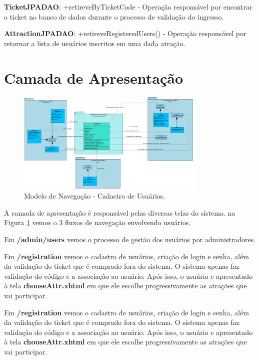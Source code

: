 \textbf{TicketJPADAO}: +retireveByTicketCode - Operação responsável por encontrar o ticket no banco de dados durante o processo de validação do ingresso.

\textbf{AttractionJPADAO}: +retireveRegisteredUsers() - Operação responsável por retornar a lista de usuários inscritos em uma dada atração.


\section{Camada de Apresentação}
\label{sec-frameweb-apresentacao}

\begin{figure}[h]
	\centering
	\includegraphics[width=0.8\textwidth]{figuras/ModeloNavegacaoUser.PNG}
	\caption{Modelo de Navegação - Cadastro de Usuários.}
	\label{figura-cadastrouser}
\end{figure}

A camada de apresentação é responsável pelas diversas telas do sistema. na Figura \ref{figura-cadastrouser} vemos o 3 fluxos de navegação envolvendo usuários.

Em \textbf{/admin/users} vemos o processo de gestão dos usuários por administradores.

Em \textbf{/registration} vemos o cadastro de usuários, criação de login e senha, além da validação do ticket que é comprado fora do sistema. O sistema apenas faz validação do código e a associação ao usuário. Após isso, o usuário e apresentado à tela \textbf{chooseAttr.xhtml} em que ele escolhe progressivamente  as atrações que vai participar.

Em \textbf{/registration} vemos o cadastro de usuários, criação de login e senha, além da validação do ticket que é comprado fora do sistema. O sistema apenas faz validação do código e a associação ao usuário. Após isso, o usuário e apresentado à tela \textbf{chooseAttr.xhtml} em que ele escolhe progressivamente  as atrações que vai participar.

